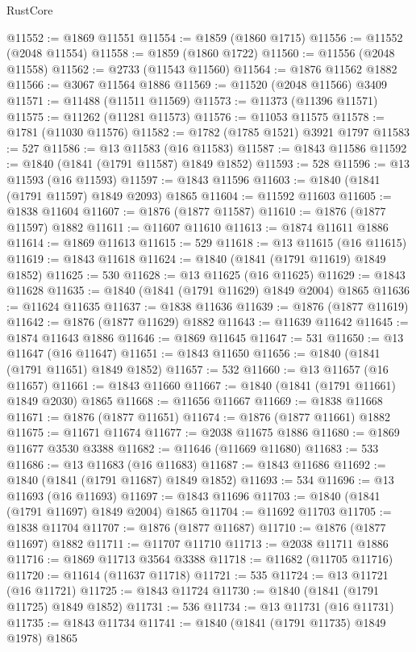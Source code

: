 \begin{lexlean}{RustCore}
\begin{coremodule}
@11552 := @1869 @11551
@11554 := @1859 (@1860 @1715)
@11556 := @11552 (@2048 @11554)
@11558 := @1859 (@1860 @1722)
@11560 := @11556 (@2048 @11558)
@11562 := @2733 (@11543 @11560)
@11564 := @1876 @11562 @1882
@11566 := @3067 @11564 @1886
@11569 := @11520 (@2048 @11566) @3409
@11571 := @11488 (@11511 @11569)
@11573 := @11373 (@11396 @11571)
@11575 := @11262 (@11281 @11573)
@11576 := @11053 @11575
@11578 := @1781 (@11030 @11576)
@11582 := @1782 (@1785 @1521) @3921 @1797
@11583 := 527
@11586 := @13 @11583 (@16 @11583)
@11587 := @1843 @11586
@11592 := @1840 (@1841 (@1791 @11587) @1849 @1852)
@11593 := 528
@11596 := @13 @11593 (@16 @11593)
@11597 := @1843 @11596
@11603 := @1840 (@1841 (@1791 @11597) @1849 @2093) @1865
@11604 := @11592 @11603
@11605 := @1838 @11604
@11607 := @1876 (@1877 @11587)
@11610 := @1876 (@1877 @11597) @1882
@11611 := @11607 @11610
@11613 := @1874 @11611 @1886
@11614 := @1869 @11613
@11615 := 529
@11618 := @13 @11615 (@16 @11615)
@11619 := @1843 @11618
@11624 := @1840 (@1841 (@1791 @11619) @1849 @1852)
@11625 := 530
@11628 := @13 @11625 (@16 @11625)
@11629 := @1843 @11628
@11635 := @1840 (@1841 (@1791 @11629) @1849 @2004) @1865
@11636 := @11624 @11635
@11637 := @1838 @11636
@11639 := @1876 (@1877 @11619)
@11642 := @1876 (@1877 @11629) @1882
@11643 := @11639 @11642
@11645 := @1874 @11643 @1886
@11646 := @1869 @11645
@11647 := 531
@11650 := @13 @11647 (@16 @11647)
@11651 := @1843 @11650
@11656 := @1840 (@1841 (@1791 @11651) @1849 @1852)
@11657 := 532
@11660 := @13 @11657 (@16 @11657)
@11661 := @1843 @11660
@11667 := @1840 (@1841 (@1791 @11661) @1849 @2030) @1865
@11668 := @11656 @11667
@11669 := @1838 @11668
@11671 := @1876 (@1877 @11651)
@11674 := @1876 (@1877 @11661) @1882
@11675 := @11671 @11674
@11677 := @2038 @11675 @1886
@11680 := @1869 @11677 @3530 @3388
@11682 := @11646 (@11669 @11680)
@11683 := 533
@11686 := @13 @11683 (@16 @11683)
@11687 := @1843 @11686
@11692 := @1840 (@1841 (@1791 @11687) @1849 @1852)
@11693 := 534
@11696 := @13 @11693 (@16 @11693)
@11697 := @1843 @11696
@11703 := @1840 (@1841 (@1791 @11697) @1849 @2004) @1865
@11704 := @11692 @11703
@11705 := @1838 @11704
@11707 := @1876 (@1877 @11687)
@11710 := @1876 (@1877 @11697) @1882
@11711 := @11707 @11710
@11713 := @2038 @11711 @1886
@11716 := @1869 @11713 @3564 @3388
@11718 := @11682 (@11705 @11716)
@11720 := @11614 (@11637 @11718)
@11721 := 535
@11724 := @13 @11721 (@16 @11721)
@11725 := @1843 @11724
@11730 := @1840 (@1841 (@1791 @11725) @1849 @1852)
@11731 := 536
@11734 := @13 @11731 (@16 @11731)
@11735 := @1843 @11734
@11741 := @1840 (@1841 (@1791 @11735) @1849 @1978) @1865

\end{coremodule}
\end{lexlean}
